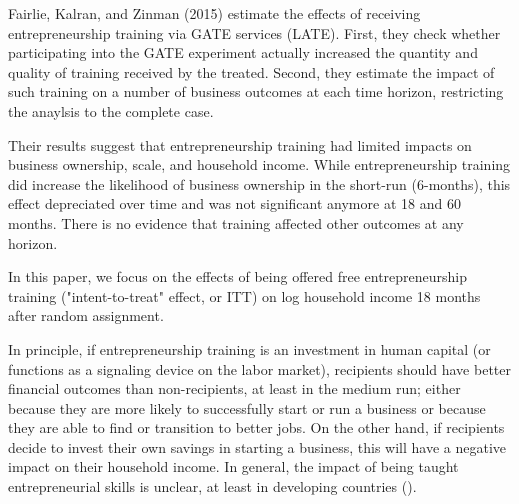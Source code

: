 Fairlie, Kalran, and Zinman (2015) estimate the effects of receiving entrepreneurship training via GATE services (LATE). First, they check whether participating into the GATE experiment actually increased the quantity and quality of training received by the treated. Second, they estimate the impact of such training on a number of business outcomes at each time horizon, restricting the anaylsis to the complete case.

Their results suggest that entrepreneurship training had limited impacts on business ownership, scale, and household income. While entrepreneurship training did increase the likelihood of business ownership in the short-run (6-months), this effect depreciated over time and was not significant anymore at 18 and 60 months. There is no evidence that training affected other outcomes at any horizon.

In this paper, we focus on the effects of being offered free entrepreneurship training ("intent-to-treat" effect, or ITT) on log household income 18 months after random assignment.

In principle, if entrepreneurship training is an investment in human capital (or functions as a signaling device on the labor market), recipients should have better financial outcomes than non-recipients, at least in the medium run; either because they are more likely to successfully start or run a business or because they are able to find or transition to better jobs. On the other hand, if recipients decide to invest their own savings in starting a business, this will have a negative impact on their household income. In general, the impact of being taught entrepreneurial skills is unclear, at least in developing countries (\cite{mckenzie2014}).
